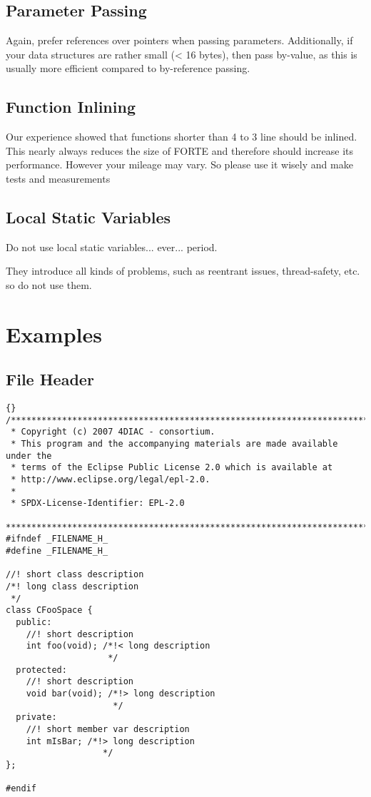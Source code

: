 \documentclass[final,a4paper,10pt, oneside]{article}
\begin{document}
\subsection{Parameter Passing}
Again, prefer references over pointers when passing parameters.
Additionally, if your data structures are rather small (< 16 bytes), then pass by-value, as this is usually more efficient compared to by-reference passing.


\subsection{Function Inlining}
Our experience showed that functions shorter than 4 to 3 line should be inlined. This nearly always reduces the size of FORTE and therefore should increase its performance. However your mileage may vary. So please use it wisely and make tests and measurements


\subsection{Local Static Variables}
Do not use local static variables... ever... period.

They introduce all kinds of problems, such as reentrant issues, thread-safety, etc. so do not use them.

\appendix
\section{Examples}
\subsection{File Header} \label{subsec:FileHeader}

\begin{lstlisting}[frame=trbl]{}
/*******************************************************************************
 * Copyright (c) 2007 4DIAC - consortium.
 * This program and the accompanying materials are made available under the
 * terms of the Eclipse Public License 2.0 which is available at
 * http://www.eclipse.org/legal/epl-2.0.
 *
 * SPDX-License-Identifier: EPL-2.0
 *******************************************************************************
#ifndef _FILENAME_H_  
#define _FILENAME_H_  

//! short class description
/*! long class description
 */
class CFooSpace {
  public:
    //! short description
    int foo(void); /*!< long description
                    */   
  protected:
    //! short description
    void bar(void); /*!> long description
                     */
  private:
    //! short member var description
    int mIsBar; /*!> long description
                   */  
};

#endif
\end{lstlisting}
\end{document}
